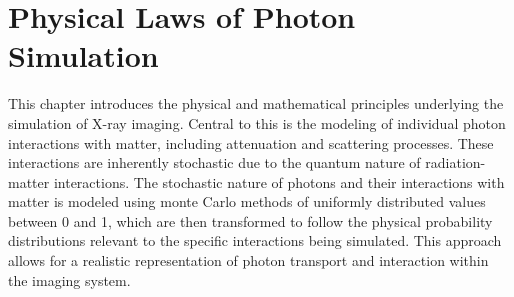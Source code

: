 \chapter{Physical Laws of Photon Simulation}
\label{chapter9}

This chapter introduces the physical and mathematical principles underlying the
simulation of X-ray imaging. Central to this is the modeling of individual
photon interactions with matter, including attenuation and scattering processes.
These interactions are inherently stochastic due to the quantum nature of
radiation-matter interactions. The stochastic nature of photons and their interactions with matter is modeled using monte Carlo methods of uniformly distributed values between 0 and 1, which are then transformed to follow the physical probability distributions relevant to the specific interactions being simulated. This approach allows for a realistic representation of photon transport and interaction within the imaging system.

